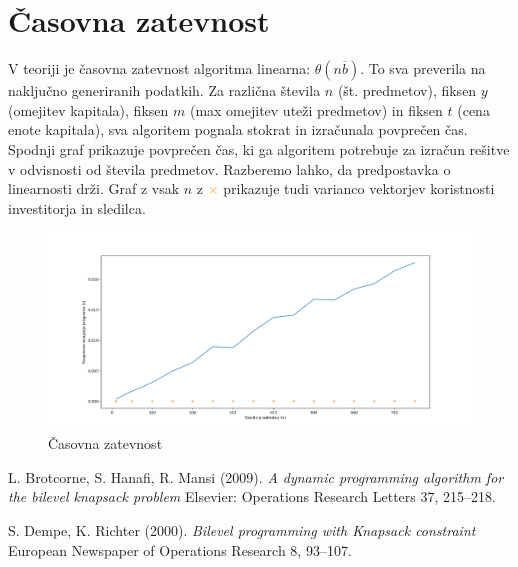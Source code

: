 \documentclass[a4paper, 11pt]{article}
\begin{document}
	\section{Časovna zatevnost}
	
	V teoriji je časovna zatevnost algoritma linearna: $\theta(n\overline{b})$. To sva preverila na naključno generiranih podatkih. Za različna števila $n$ (št. predmetov), fiksen $y$ (omejitev kapitala), fiksen $m$ (max omejitev uteži predmetov) in fiksen $t$ (cena enote kapitala), sva algoritem pognala stokrat in izračunala povprečen čas. Spodnji graf prikazuje povprečen čas, ki ga algoritem potrebuje za izračun rešitve v odvisnosti od števila predmetov. Razberemo lahko, da predpostavka o linearnosti drži. Graf z vsak $n$ z \textcolor{orange}{$\times$} prikazuje tudi varianco vektorjev koristnosti investitorja in sledilca.
	\begin{figure}[h]
    	\centering
    		\includegraphics[scale=0.3]{BKP_casovna_zahtevnost.png}
    		\caption{Časovna zatevnost}
    		\label{fig:graf1}
	\end{figure}
	
		\pagebreak


		
		\begin{thebibliography}{9}
		
			 L. Brotcorne, S. Hanafi, R. Mansi (2009).
			\textit{A dynamic programming algorithm for the bilevel knapsack problem} Elsevier: Operations Research Letters 37, 215–218.
			
    			 S. Dempe, K. Richter (2000). 
			\textit{Bilevel programming with Knapsack constraint} European Newspaper of Operations Research 8, 93–107.
			
		\end{thebibliography}
	
	
	
	
\end{document}
